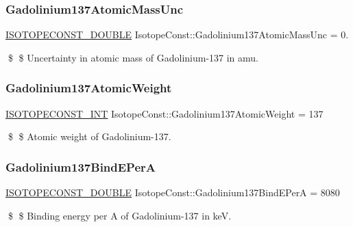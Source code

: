 \subsubsection{\texorpdfstring{Gadolinium137\+Atomic\+Mass\+Unc}{Gadolinium137AtomicMassUnc}}
{\footnotesize\ttfamily \mbox{\hyperlink{group___isotope_const-_macros_ga8f45a7272ce02c0b4c65c44636ed719a}{I\+S\+O\+T\+O\+P\+E\+C\+O\+N\+S\+T\+\_\+\+D\+O\+U\+B\+LE}} Isotope\+Const\+::\+Gadolinium137\+Atomic\+Mass\+Unc = 0.}

\$ \$ Uncertainty in atomic mass of Gadolinium-\/137 in amu. \mbox{\label{group___isotope_const-_gadolinium-_gd137_gaf63a0a7b9b32ff9ed2c5187b7018cd6d}} 
\subsubsection{\texorpdfstring{Gadolinium137\+Atomic\+Weight}{Gadolinium137AtomicWeight}}
{\footnotesize\ttfamily \mbox{\hyperlink{group___isotope_const-_macros_ga5f18360b3e99483a35c32d789e62621c}{I\+S\+O\+T\+O\+P\+E\+C\+O\+N\+S\+T\+\_\+\+I\+NT}} Isotope\+Const\+::\+Gadolinium137\+Atomic\+Weight = 137}

\$ \$ Atomic weight of Gadolinium-\/137. \mbox{\label{group___isotope_const-_gadolinium-_gd137_ga16b9e43e32a4d328403be4dbfd129b09}} 
\subsubsection{\texorpdfstring{Gadolinium137\+Bind\+E\+PerA}{Gadolinium137BindEPerA}}
{\footnotesize\ttfamily \mbox{\hyperlink{group___isotope_const-_macros_ga8f45a7272ce02c0b4c65c44636ed719a}{I\+S\+O\+T\+O\+P\+E\+C\+O\+N\+S\+T\+\_\+\+D\+O\+U\+B\+LE}} Isotope\+Const\+::\+Gadolinium137\+Bind\+E\+PerA = 8080}

\$ \$ Binding energy per A of Gadolinium-\/137 in keV. \mbox{\label{group___isotope_const-_gadolinium-_gd137_ga1e1f3756323b9e6ed6eedc8a9b21fdfa}} 
